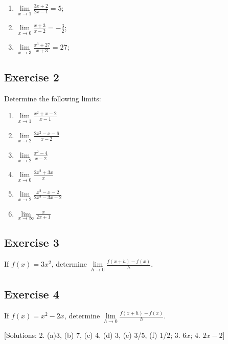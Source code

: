 \documentclass[
  11pt,
  oneside]{book}
\providecommand{\tightlist}{%
  \setlength{\itemsep}{0pt}\setlength{\parskip}{0pt}}
\newcommand{\slide}{}
\theoremstyle{definition}
\theoremstyle{definition}
\theoremstyle{definition}
\theoremstyle{definition}
\theoremstyle{remark}
\begin{document}
\begin{enumerate}
\def\labelenumi{\alph{enumi}.}
\tightlist
\item
  \(\lim\limits_{x\to1}\frac{3x+2}{2x-1} = 5\);
\item
  \(\lim\limits_{x\to0}\frac{x+3}{x-2} = -\frac 32\);
\item
  \(\lim\limits_{x\to3}\frac{x^3+27}{x+3} = 27\);
\end{enumerate}

\slide

\subsection*{Exercise 2}\label{exercise-2}

Determine the following limits:

\begin{enumerate}
\def\labelenumi{\alph{enumi}.}
\tightlist
\item
  \(\lim\limits_{x\to1}\frac{x^2+x-2}{x-1}\)
\item
  \(\lim\limits_{x\to2}\frac{2x^2-x-6}{x-2}\)
\item
  \(\lim\limits_{x\to2}\frac{x^2-4}{x-2}\)
\item
  \(\lim\limits_{x\to0}\frac{2x^2+3x}{x}\)
\item
  \(\lim\limits_{x\to2}\frac{x^2-x-2}{2x^2-3x-2}\)
\item
  \(\lim\limits_{x\to\infty}\frac{x}{2x+1}\)
\end{enumerate}

\slide

\subsection*{Exercise 3}\label{exercise-3}

If \(f(x) = 3x^2\), determine \(\lim\limits_{h\to 0}\frac{f(x+h)-f(x)}{h}\).

\slide

\subsection*{Exercise 4}\label{exercise-4}

If \(f(x) = x^2-2x\), determine \(\lim\limits_{h\to 0}\frac{f(x+h)-f(x)}{h}\).
\slide

{[}Solutions: 2. (a)3, (b) 7, (c) 4, (d) 3, (e) 3/5, (f) 1/2; 3. \(6x\); 4. \(2x-2\){]}
\slide
\end{document}
